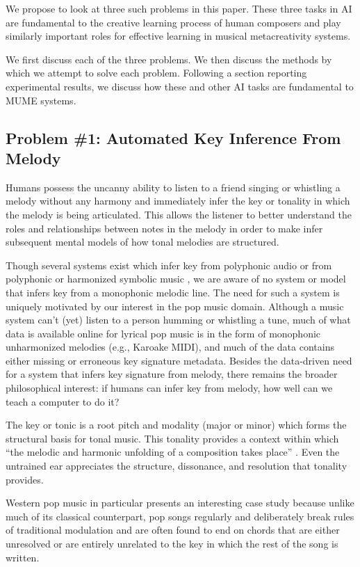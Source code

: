 \documentclass[letterpaper]{article}
\begin{document}
We propose to look at three such problems in this paper. These three tasks in AI are fundamental to the creative learning process of human composers and play similarly important roles for effective learning in musical metacreativity systems.

We first discuss each of the three problems. We then discuss the methods by which we attempt to solve each problem. Following a section reporting experimental results, we discuss how these and other AI tasks are fundamental to MUME systems.

\subsection{Problem \#1: Automated Key Inference From Melody}

Humans possess the uncanny ability to listen to a friend singing or whistling a melody without any harmony and immediately infer the key or tonality in which the melody is being articulated. This allows the listener to better understand the roles and relationships between notes in the melody in order to make infer subsequent mental models of how tonal melodies are structured.

Though several systems exist which infer key from polyphonic audio \cite{A,B,C} or from polyphonic or harmonized symbolic music \cite{D,E,F}, we are aware of no system or model that infers key from a monophonic melodic line. The need for such a system is uniquely motivated by our interest in the pop music domain. Although a music system can't (yet) listen to a person humming or whistling a tune, much of what data is available online for lyrical pop music is in the form of monophonic unharmonized melodies (e.g., Karoake MIDI), and much of the data contains either missing or erroneous key signature metadata. Besides the data-driven need for a system that infers key signature from melody, there remains the broader philosophical interest: if humans can infer key from melody, how well can we teach a computer to do it?

\noindent The key or tonic is a root pitch and modality (major or minor) which forms the structural basis for tonal music. This tonality provides a context within which ``the melodic and harmonic unfolding of a composition takes place'' \cite{vos1996parallel}. Even the untrained ear appreciates the structure, dissonance, and resolution that tonality provides.

Western pop music in particular presents an interesting case study because unlike much of its classical counterpart, pop songs regularly and deliberately break rules of traditional modulation and are often found to end on chords that are either unresolved or are entirely unrelated to the key in which the rest of the song is written.
\end{document}
